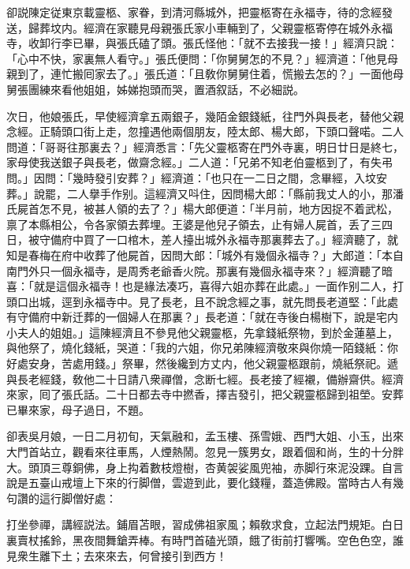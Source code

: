 卻説陳定従東京載靈柩、家眷，到清河縣城外，把靈柩寄在永福寺，待的念經發送，歸葬坟内。經濟在家聽見母親張氏家小車輛到了，父親靈柩寄停在城外永福寺，收卸行李已畢，與張氏磕了頭。張氏怪他：「就不去接我一接！」經濟只說：「心中不快，家裏無人看守。」張氏便問：「你舅舅怎的不見？」經濟道：「他見母親到了，連忙搬囘家去了。」張氏道：「且敎你舅舅住着，慌搬去怎的？」一面他母舅張團練來看他姐姐，姊娣抱頭而哭，置酒叙話，不必細説。

次日，他娘張氏，早使經濟拿五兩銀子，幾陌金銀錢紙，往門外與長老，替他父親念經。正騎頭口街上走，忽撞遇他兩個朋友，陸太郎、楊大郎，下頭口聲喏。二人問道：「哥哥往那裏去？」經濟悉言：「先父靈柩寄在門外寺裏，明日廿日是終七，家母使我送銀子與長老，做齋念經。」二人道：「兄弟不知老伯靈柩到了，有失弔問。」因問：「幾時發引安葬？」經濟道：「也只在一二日之間，念畢經，入坟安葬。」說罷，二人擧手作别。這經濟又呌住，因問楊大郎：「縣前我丈人的小，那潘氏屍首怎不見，被甚人領的去了？」楊大郎便道：「半月前，地方因捉不着武松，禀了本縣相公，令各家領去葬埋。王婆是他兒子領去，止有婦人屍首，丢了三四日，被守備府中買了一口棺木，差人擡出城外永福寺那裏葬去了。」經濟聽了，就知是春梅在府中收葬了他屍首，因問大郎：「城外有幾個永福寺？」大郎道：「本自南門外只一個永福寺，是周秀老爺香火院。那裏有幾個永福寺來？」經濟聽了暗喜：「就是這個永福寺！也是緣法凑巧，喜得六姐亦葬在此處。」一面作别二人，打頭口出城，逕到永福寺中。見了長老，且不說念經之事，就先問長老道堅：「此處有守備府中新迁葬的一個婦人在那裏？」長老道：「就在寺後白楊樹下，說是宅内小夫人的姐姐。」這陳經濟且不參見他父親靈柩，先拿錢紙祭物，到於金蓮墓上，與他祭了，燒化錢紙，哭道：「我的六姐，你兄弟陳經濟敬來與你燒一陌錢紙：你好處安身，苦處用錢。」祭畢，然後纔到方丈内，他父親靈柩跟前，燒紙祭祀。遞與長老經錢，敎他二十日請八衆禪僧，念断七經。長老接了經襯，備辦齋供。經濟來家，囘了張氏話。二十日都去寺中撚香，擇吉發引，把父親靈柩歸到祖塋。安葬已畢來家，母子過日，不題。

卻表吳月娘，一日二月初旬，天氣融和，孟玉樓、孫雪娥、西門大姐、小玉，出來大門首站立，觀看來往車馬，人煙熱鬧。忽見一簇男女，跟着個和尚，生的十分胖大。頭頂三尊銅佛，身上抅着數枝燈樹，杏黄袈娑風兜袖，赤脚行來泥没踝。自言說是五臺山戒壇上下來的行脚僧，雲遊到此，要化錢糧，蓋造佛殿。當時古人有幾句讚的這行脚僧好處：

\begin{myquote}
打坐參禪，講經説法。鋪眉苫眼，習成佛祖家風；賴敎求食，立起法門規矩。白日裏賣杖搖鈴，黑夜間舞鎗弄棒。有時門首磕光頭，餓了街前打響嘴。空色色空，誰見衆生離下土；去來來去，何曾接引到西方！
\end{myquote}


